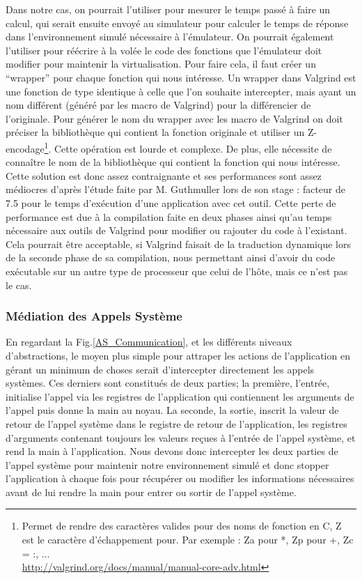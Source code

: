 Dans notre cas, on pourrait l'utiliser pour mesurer le temps passé à faire un
calcul, qui serait ensuite envoyé au simulateur pour calculer le temps de
réponse dans l'environnement simulé nécessaire à l'émulateur. On pourrait
également l'utiliser pour réécrire à la volée le code des fonctions que
l'émulateur doit modifier pour maintenir la virtualisation. Pour faire cela, il
faut créer un ``wrapper'' pour chaque fonction qui nous intéresse. Un wrapper
dans Valgrind est une fonction de type identique à celle que l'on souhaite
intercepter, mais ayant un nom différent (généré par les macro de Valgrind) pour
la différencier de l'originale. Pour générer le nom du wrapper avec les macro de
Valgrind on doit préciser la bibliothèque qui contient la fonction originale et
utiliser un Z-encodage\footnote{ Permet de rendre des caractères valides pour
  des noms de fonction en C, Z est le caractère d'échappement pour. Par exemple : Za pour *, Zp pour +, Zc = :, ... \\ \url{http://valgrind.org/docs/manual/manual-core-adv.html}}. Cette opération
est lourde et complexe. De plus, elle nécessite de connaître le nom de la
bibliothèque qui contient la fonction qui nous intéresse. Cette solution est
donc assez contraignante et ses performances sont assez médiocres d'après
l'étude faite par M. Guthmuller lors de son stage \citet{INTERCEPTION:MARION}:
facteur de 7.5 pour le temps d'exécution d'une application avec cet outil. Cette
perte de performance est due à la compilation faite en deux phases ainsi qu'au
temps nécessaire aux outils de Valgrind pour modifier ou rajouter du code à
l'existant. Cela pourrait être acceptable, si Valgrind faisait de la traduction
dynamique lors de la seconde phase de sa compilation, nous permettant ainsi
d'avoir du code exécutable sur un autre type de processeur que celui de l'hôte,
mais ce n'est pas le cas.

\subsubsection{Médiation des Appels Système}

En regardant la Fig.\ref{AS_Communication}, et les différents niveaux
d'abstractions, le moyen plus simple pour attraper les actions de l'application
en gérant un minimum de choses serait d'intercepter directement les appels
systèmes.  Ces derniers sont constitués de deux parties; la première, l'entrée,
initialise l'appel via les registres de l'application qui contiennent les
arguments de l'appel puis donne la main au noyau. La seconde, la sortie, inscrit
la valeur de retour de l'appel système dans le registre de retour de
l'application, les registres d'arguments contenant toujours les valeurs reçues à
l'entrée de l'appel système, et rend la main à l'application. Nous devons donc
intercepter les deux parties de l'appel système pour maintenir notre
environnement simulé et donc stopper l'application à chaque fois pour récupérer
ou modifier les informations nécessaires avant de lui rendre la main pour entrer
ou sortir de l'appel système.

